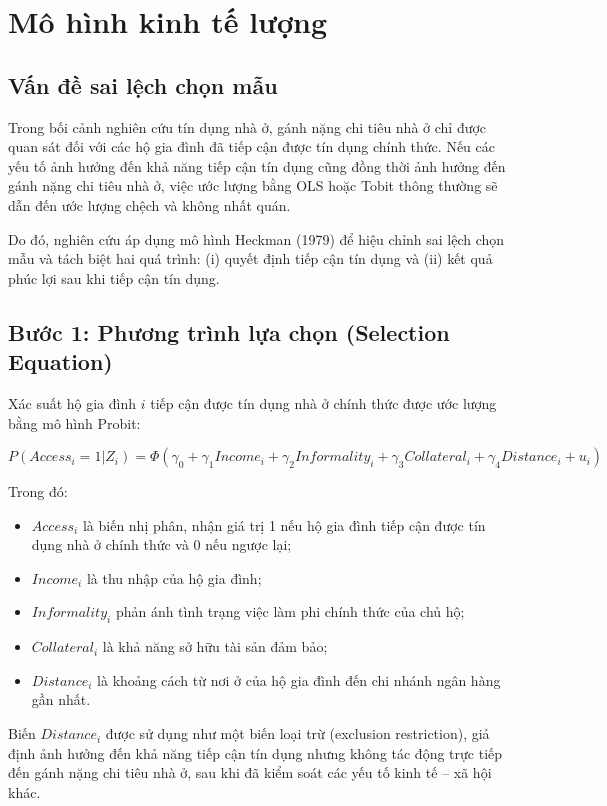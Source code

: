 \documentclass[12pt,a4paper]{report}
\begin{document}
	\section{Mô hình kinh tế lượng}
	
	\subsection{Vấn đề sai lệch chọn mẫu}
	
	Trong bối cảnh nghiên cứu tín dụng nhà ở, gánh nặng chi tiêu nhà ở chỉ được quan sát đối với các hộ gia đình đã tiếp cận được tín dụng chính thức. Nếu các yếu tố ảnh hưởng đến khả năng tiếp cận tín dụng cũng đồng thời ảnh hưởng đến gánh nặng chi tiêu nhà ở, việc ước lượng bằng OLS hoặc Tobit thông thường sẽ dẫn đến ước lượng chệch và không nhất quán.
	
	Do đó, nghiên cứu áp dụng mô hình Heckman (1979) để hiệu chỉnh sai lệch chọn mẫu và tách biệt hai quá trình: (i) quyết định tiếp cận tín dụng và (ii) kết quả phúc lợi sau khi tiếp cận tín dụng.
	
	\subsection{Bước 1: Phương trình lựa chọn (Selection Equation)}
	
	Xác suất hộ gia đình $i$ tiếp cận được tín dụng nhà ở chính thức được ước lượng bằng mô hình Probit:
	
	\begin{equation}
		P(Access_i = 1 | Z_i) = \Phi(\gamma_0 + \gamma_1 Income_i + \gamma_2 Informality_i + \gamma_3 Collateral_i + \gamma_4 Distance_i + u_i)
	\end{equation}
	
	Trong đó:
	\begin{itemize}
		\item $Access_i$ là biến nhị phân, nhận giá trị 1 nếu hộ gia đình tiếp cận được tín dụng nhà ở chính thức và 0 nếu ngược lại;
		\item $Income_i$ là thu nhập của hộ gia đình;
		\item $Informality_i$ phản ánh tình trạng việc làm phi chính thức của chủ hộ;
		\item $Collateral_i$ là khả năng sở hữu tài sản đảm bảo;
		\item $Distance_i$ là khoảng cách từ nơi ở của hộ gia đình đến chi nhánh ngân hàng gần nhất.
	\end{itemize}
	
	Biến $Distance_i$ được sử dụng như một biến loại trừ (exclusion restriction), giả định ảnh hưởng đến khả năng tiếp cận tín dụng nhưng không tác động trực tiếp đến gánh nặng chi tiêu nhà ở, sau khi đã kiểm soát các yếu tố kinh tế – xã hội khác.
	
\end{document}
